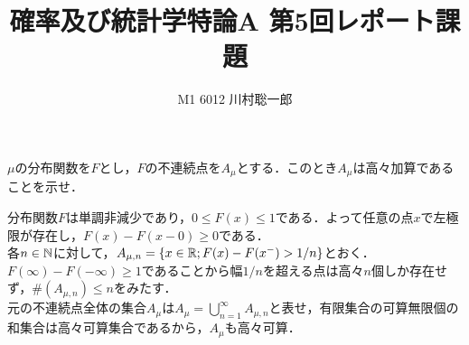 \documentclass[dvipdfmx]{jsreport}
\title{確率及び統計学特論A 第5回レポート課題}
\author{M1 6012 川村聡一郎}
\date{}
\begin{document}
\maketitle

\begin{tcolorbox}
	$\mu$の分布関数を$F$とし，$F$の不連続点を$A_\mu$とする．このとき$A_\mu$は高々加算であることを示せ．
\end{tcolorbox}

\begin{souanswer} %
	分布関数$F$は単調非減少であり，$0\le F(x)\le 1$である．よって任意の点$x$で左極限が存在し，$F(x)- F(x- 0)\ge 0$である．\\
	各$n\in \mathbb{N}$に対して，$A_{\mu, n}= \{x\in \mathbb{R}; F(x)- F(x^-)> 1/n\}$とおく．\\
	$F(\infty)- F(-\infty)\ge 1$であることから幅$1/n$を超える点は高々$n$個しか存在せず，$\#(A_{\mu, n})\le n$をみたす．\\
	元の不連続点全体の集合$A_\mu$は$A_\mu= \bigcup_{n= 1}^\infty A_{\mu, n}$と表せ，有限集合の可算無限個の和集合は高々可算集合であるから，$A_\mu$も高々可算．
\end{souanswer}
\end{document}
